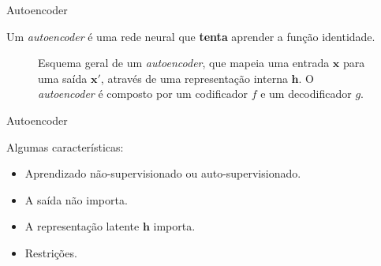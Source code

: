 \documentclass[dvipsnames]{beamer}
\begin{document}
\begin{frame}{Autoencoder}

	\justifying

	Um \emph{autoencoder} é uma rede neural que \textbf{tenta} aprender a função identidade.

	\begin{figure}

		\centering


		\caption{
			\justifying
			Esquema geral de um \emph{autoencoder}, que mapeia uma entrada $\boldsymbol{x}$ para uma saída $\boldsymbol{x'}$, através de uma representação interna $\boldsymbol{h}$.
			O \emph{autoencoder} é composto por um codificador $f$ e um decodificador $g$.
		}

	\end{figure}

\end{frame}

\begin{frame}{Autoencoder}

	Algumas características:

	\begin{itemize}
		\item Aprendizado não-supervisionado ou auto-supervisionado.
		\item A saída não importa.
		\item A representação latente $\boldsymbol{h}$ importa.
		\item Restrições.
	\end{itemize}

\end{frame}
\end{document}
